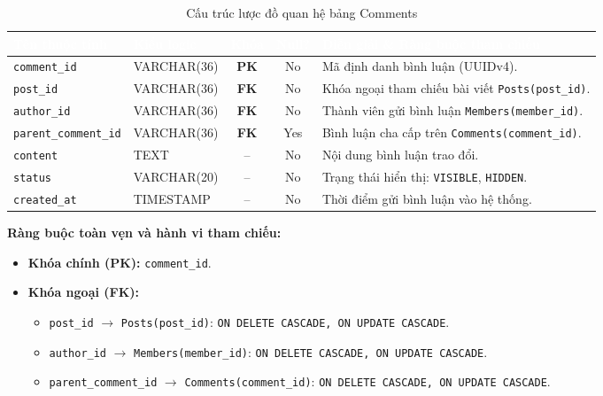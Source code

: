 \begin{table}[H]
    \centering
    \small
    \renewcommand{\arraystretch}{1.2}
    \begin{tabularx}{\textwidth}{p{3.4cm} p{2.6cm} c c X}
        \toprule
        \rowcolor{tableheader}\textcolor{white}{\textbf{Tên thuộc tính}} & \textcolor{white}{\textbf{Kiểu logic}} & \textcolor{white}{\textbf{Khóa}} & \textcolor{white}{\textbf{Null?}} & \textcolor{white}{\textbf{Diễn giải \& Ràng buộc tham chiếu}} \\
        \midrule
        \rowcolor{tablerowalt}
        \texttt{comment\_id} & VARCHAR(36) & \textcolor{pkcolor}{\textbf{PK}} & No & Mã định danh bình luận (UUIDv4). \\
        \texttt{post\_id} & VARCHAR(36) & \textcolor{fkcolor}{\textbf{FK}} & No & Khóa ngoại tham chiếu bài viết \texttt{Posts(post\_id)}. \\
        \rowcolor{tablerowalt}
        \texttt{author\_id} & VARCHAR(36) & \textcolor{fkcolor}{\textbf{FK}} & No & Thành viên gửi bình luận \texttt{Members(member\_id)}. \\
        \texttt{parent\_comment\_id} & VARCHAR(36) & \textcolor{fkcolor}{\textbf{FK}} & Yes & Bình luận cha cấp trên \texttt{Comments(comment\_id)}. \\
        \rowcolor{tablerowalt}
        \texttt{content} & TEXT & -- & No & Nội dung bình luận trao đổi. \\
        \texttt{status} & VARCHAR(20) & -- & No & Trạng thái hiển thị: \texttt{VISIBLE}, \texttt{HIDDEN}. \\
        \rowcolor{tablerowalt}
        \texttt{created\_at} & TIMESTAMP & -- & No & Thời điểm gửi bình luận vào hệ thống. \\
        \bottomrule
    \end{tabularx}
    \caption{Cấu trúc lược đồ quan hệ bảng Comments}
    \label{tab:schema_comments}
\end{table}

\noindent\textbf{Ràng buộc toàn vẹn và hành vi tham chiếu:}
\begin{itemize}[noitemsep,topsep=2pt]
    \item \textbf{Khóa chính (PK):} \texttt{comment\_id}.
    \item \textbf{Khóa ngoại (FK):}
    \begin{itemize}[noitemsep]
        \item \texttt{post\_id} $\rightarrow$ \texttt{Posts(post\_id)}: \texttt{ON DELETE CASCADE, ON UPDATE CASCADE}.
        \item \texttt{author\_id} $\rightarrow$ \texttt{Members(member\_id)}: \texttt{ON DELETE CASCADE, ON UPDATE CASCADE}.
        \item \texttt{parent\_comment\_id} $\rightarrow$ \texttt{Comments(comment\_id)}: \texttt{ON DELETE CASCADE, ON UPDATE CASCADE}.
    \end{itemize}
\end{itemize}

